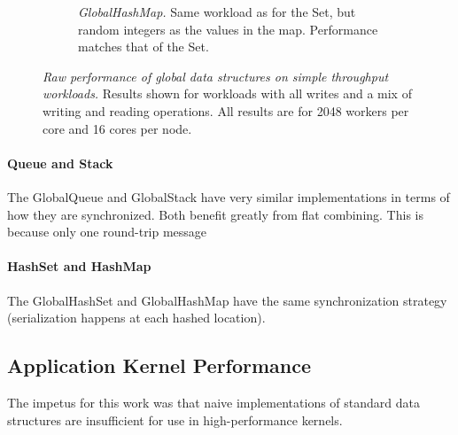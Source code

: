 \begin{figure}[t]
\begin{subfigure}[b]{0.45\textwidth}
  \caption{\emph{GlobalHashMap.} Same workload as for the Set, but random integers as the values in the map. Performance matches that of the Set.} 
  \label{fig:hashmap}
  \end{subfigure}%
  \caption{
    \emph{Raw performance of global data structures on simple throughput workloads.}
    Results shown for workloads with all writes and a mix of writing and reading operations. All results are for 2048 workers per core and 16 cores per node.
  }\label{fig:datastructs}
\end{figure}

\paragraph{Queue and Stack}
The GlobalQueue and GlobalStack have very similar implementations in terms of how they are synchronized. Both benefit greatly from flat combining. This is because only one round-trip message 


\paragraph{HashSet and HashMap}
The GlobalHashSet and GlobalHashMap have the same synchronization strategy (serialization happens at each hashed location).

\subsection{Application Kernel Performance}
The impetus for this work was that naive implementations of standard data structures are insufficient for use in high-performance kernels.

